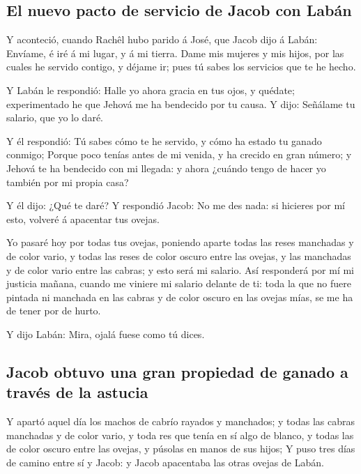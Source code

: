 \hypertarget{el-nuevo-pacto-de-servicio-de-jacob-con-labuxe1n}{%
\subsection{El nuevo pacto de servicio de Jacob con
Labán}\label{el-nuevo-pacto-de-servicio-de-jacob-con-labuxe1n}}

 Y aconteció, cuando Rachêl hubo parido á José, que Jacob
dijo á Labán: Envíame, é iré á mi lugar, y á mi tierra. 
Dame mis mujeres y mis hijos, por las cuales he servido contigo, y
déjame ir; pues tú sabes los servicios que te he hecho.

 Y Labán le respondió: Halle yo ahora gracia en tus ojos,
y quédate; experimentado he que Jehová me ha bendecido por tu causa.
 Y dijo: Señálame tu salario, que yo lo daré.

 Y él respondió: Tú sabes cómo te he servido, y cómo ha
estado tu ganado conmigo;  Porque poco tenías antes de mi
venida, y ha crecido en gran número; y Jehová te ha bendecido con mi
llegada: y ahora ¿cuándo tengo de hacer yo también por mi propia casa?

 Y él dijo: ¿Qué te daré? Y respondió Jacob: No me des
nada: si hicieres por mí esto, volveré á apacentar tus ovejas.

 Yo pasaré hoy por todas tus ovejas, poniendo aparte
todas las reses manchadas y de color vario, y todas las reses de color
oscuro entre las ovejas, y las manchadas y de color vario entre las
cabras; y esto será mi salario.  Así responderá por mí mi
justicia mañana, cuando me viniere mi salario delante de ti: toda la que
no fuere pintada ni manchada en las cabras y de color oscuro en las
ovejas mías, se me ha de tener por de hurto.

 Y dijo Labán: Mira, ojalá fuese como tú dices.

\hypertarget{jacob-obtuvo-una-gran-propiedad-de-ganado-a-travuxe9s-de-la-astucia}{%
\subsection{Jacob obtuvo una gran propiedad de ganado a través de la
astucia}\label{jacob-obtuvo-una-gran-propiedad-de-ganado-a-travuxe9s-de-la-astucia}}

 Y apartó aquel día los machos de cabrío rayados y
manchados; y todas las cabras manchadas y de color vario, y toda res que
tenía en sí algo de blanco, y todas las de color oscuro entre las
ovejas, y púsolas en manos de sus hijos;  Y puso tres
días de camino entre sí y Jacob: y Jacob apacentaba las otras ovejas de
Labán.

